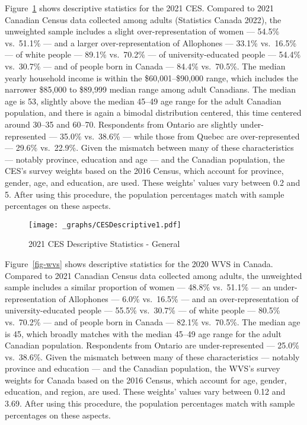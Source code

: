 \documentclass[
  letterpaper,
  DIV=11,
  numbers=noendperiod]{scrreprt}
\begin{document}
Figure~\ref{fig-ces} shows descriptive statistics for the 2021 CES.
Compared to 2021 Canadian Census data collected among adults (Statistics
Canada 2022), the unweighted sample includes a slight
over-representation of women --- 54.5\% vs.~51.1\% --- and a larger
over-representation of Allophones --- 33.1\% vs.~16.5\% --- of white
people --- 89.1\% vs.~70.2\% --- of university-educated people ---
54.4\% vs.~30.7\% --- and of people born in Canada --- 84.4\%
vs.~70.5\%. The median yearly household income is within the
\$60,001--\$90,000 range, which includes the narrower \$85,000 to
\$89,999 median range among adult Canadians. The median age is 53,
slightly above the median 45--49 age range for the adult Canadian
population, and there is again a bimodal distribution centered, this
time centered around 30--35 and 60--70. Respondents from Ontario are
slightly under-represented --- 35.0\% vs.~38.6\% --- while those from
Quebec are over-represented --- 29.6\% vs.~22.9\%. Given the mismatch
between many of these characteristics --- notably province, education
and age --- and the Canadian population, the CES's survey weights based
on the 2016 Census, which account for province, gender, age, and
education, are used. These weights' values vary between 0.2 and 5. After
using this procedure, the population percentages match with sample
percentages on these aspects.

\begin{figure}

{\centering \texttt{[image: \_graphs/CESDescriptive1.pdf]}

}

\caption{\label{fig-ces}2021 CES Descriptive Statistics - General}

\end{figure}

Figure~\ref{fig-wvs} shows descriptive statistics for the 2020 WVS in
Canada. Compared to 2021 Canadian Census data collected among adults,
the unweighted sample includes a similar proportion of women --- 48.8\%
vs.~51.1\% --- an under-representation of Allophones --- 6.0\%
vs.~16.5\% --- and an over-representation of university-educated people
--- 55.5\% vs.~30.7\% --- of white people --- 80.5\% vs.~70.2\% --- and
of people born in Canada --- 82.1\% vs.~70.5\%. The median age is 45,
which broadly matches with the median 45--49 age range for the adult
Canadian population. Respondents from Ontario are under-represented ---
25.0\% vs.~38.6\%. Given the mismatch between many of these
characteristics --- notably province and education --- and the Canadian
population, the WVS's survey weights for Canada based on the 2016
Census, which account for age, gender, education, and region, are used.
These weights' values vary between 0.12 and 3.69. After using this
procedure, the population percentages match with sample percentages on
these aspects.
\end{document}
